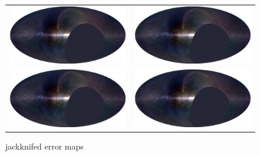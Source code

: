 \documentclass[twocolumn]{aastex6}
\begin{document}
\begin{figure}[ht]
\begin{tabular}{cc}
        \includegraphics[width=\columnwidth, draft]{maps/rgb-map} &
        \includegraphics[width=\columnwidth, draft]{maps/rgb-map} \\
        \includegraphics[width=\columnwidth, draft]{maps/rgb-map} &
        \includegraphics[width=\columnwidth, draft]{maps/rgb-map} \\
    \end{tabular}
    \caption{jackknifed error maps}
\end{figure}
\end{document}
